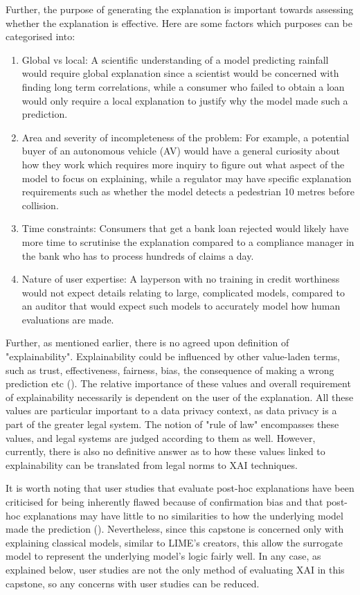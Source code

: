 Further, the purpose of generating the explanation is important towards assessing whether the explanation is effective. Here are some factors which purposes can be categorised into:
\begin{enumerate}
	\item Global vs local: A scientific understanding of a model predicting rainfall would require global explanation since a scientist would be concerned with finding long term correlations, while a consumer who failed to obtain a loan would only require a local explanation to justify why the model made such a prediction.
	\item Area and severity of incompleteness of the problem: For example, a potential buyer of an autonomous vehicle (AV) would have a general curiosity about how they work which requires more inquiry to figure out what aspect of the model to focus on explaining, while a regulator may have specific explanation requirements such as whether the model detects a pedestrian 10 metres before collision.
	\item Time constraints: Consumers that get a bank loan rejected would likely have more time to scrutinise the explanation compared to a compliance manager in the bank who has to process hundreds of claims a day.
	\item Nature of user expertise: A layperson with no training in credit worthiness would not expect details relating to large, complicated models, compared to an auditor that would expect such models to accurately model how human evaluations are made.
\end{enumerate}

Further, as mentioned earlier, there is no agreed upon definition of "explainability". Explainability could be influenced by other value-laden terms, such as trust, effectiveness, fairness, bias, the consequence of making a wrong prediction etc (\cite{rosenfeld2021}). The relative importance of these values and overall requirement of explainability necessarily is dependent on the user of the explanation. All these values are particular important to a data privacy context, as data privacy is a part of the greater legal system. The notion of "rule of law" encompasses these values, and legal systems are judged according to them as well. However, currently, there is also no definitive answer as to how these values linked to explainability can be translated from legal norms to XAI techniques.

It is worth noting that user studies that evaluate post-hoc explanations have been criticised for being inherently flawed because of confirmation bias and that post-hoc explanations may have little to no similarities to how the underlying model made the prediction (\cite{rosenfeld2021}). Nevertheless, since this capstone is concerned only with explaining classical models, similar to LIME's creators, this allow the surrogate model to represent the underlying model's logic fairly well. In any case, as explained below, user studies are not the only method of evaluating XAI in this capstone, so any concerns with user studies can be reduced.

